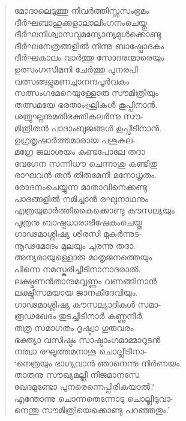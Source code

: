 \begin{verse}
മോദാലെടുത്തു നിവര്‍ത്തിസ്സസംഭ്രമം\\
ദീര്‍ഘബാഹുക്കളാലാലിംഗനംചെയ്തു\\
ദീര്‍ഘനിശ്വാസവുമന്യോന്യമുള്‍ക്കൊണ്ടു\\
ദീര്‍ഘനേത്രങ്ങളില്‍ നിന്നു ബാഷ്പോദകം\\
ദീര്‍ഘകാലം വാര്‍ത്തു സോദരന്മാരെയും\\
ഉത്സംഗസീമനി ചേര്‍ത്തു പുനരപി\\
വത്സങ്ങളുമണച്ചാനന്ദപൂര്‍വകം\\
സത്സംഗമേറെയുള്ളോരു സൗമിത്രിയും\\
തത്സമയേ ഭരതാംഘ്രികള്‍ കൂപ്പിനാന്‍.\\
ശത്രുഘ്നനുമതിഭക്തികലര്‍ന്നു സൗ-\\
മിത്രിതന്‍ പാദാംബുജങ്ങള്‍ കൂപ്പീടിനാന്‍.\\
ഉഗ്രതൃഷാര്‍ത്തമാരായ പശുകുല-\\
മഗ്രേ ജലാശയം കണ്ടപോലേ തദാ\\
വേഗേന സന്നിധൗ ചെന്നാശു കണ്ടിതു\\
രാഘവന്‍ തന്‍ തിരുമേനി മനോധൃതം.\\
രോദനംചെയ്യുന്ന മാതാവിനെക്കണ്ടു\\
പാദങ്ങളില്‍ നമിച്ചാന്‍ രഘുനാഥനും\\
എത്രയുമാര്‍ത്തികൈക്കൊണ്ടു കൗസല്യയും\\
പുത്രനു ബാഷ്പധാരാഭിഷേകംചെയ്തു\\
ഗാഢമാശ്ലിഷ്യ ശിരസി മുകര്‍ന്നുട-\\
നൂഢമോദം മുലയും ചുരന്നു തദാ.\\
അന്യരായുള്ളൊരു മാതൃജനത്തെയും\\
പിന്നെ നമസ്കരിച്ചീടിനാനാദരാല്‍.\\
ലക്ഷ്മണന്‍താനുമവ്വണ്ണം വണങ്ങിനാന്‍\\
ലക്ഷ്മീസമയായ ജാനകീദേവിയും.\\
ഗാഢമാശ്ലിഷ്യ കൗസല്യാദികള്‍ സമാ-\\
രൂഢഖേദം തുടച്ചീടിനാര്‍ കണ്ണുനീര്‍.\\
തത്ര സമാഗതം ദൃഷ്ട്വാ ഗുരുവരം\\
ഭക്ത്യാ വസിഷ്ഠം സാഷ്ടാംഗമാമ്മാറുടന്‍\\
നത്വാ രഘൂത്തമനാശു ചൊല്ലീടിനാ-\\
‘നെത്രയും ഭാഗ്യവാന്‍ ഞാനെന്നു നിര്‍ണയം.\\
താതനു സൗഖ്യമല്ലീ നിജമാനസേ\\
ഖേദമുണ്ടോ പുനരെന്നെപ്പിരികയാല്‍?\\
എന്തോന്നു ചൊന്നതെന്നോടു ചൊല്ലീടുവാ-\\
നെന്തു സൗമിത്രിയെക്കൊണ്ടു പറഞ്ഞതും.’\\

\end{verse}
